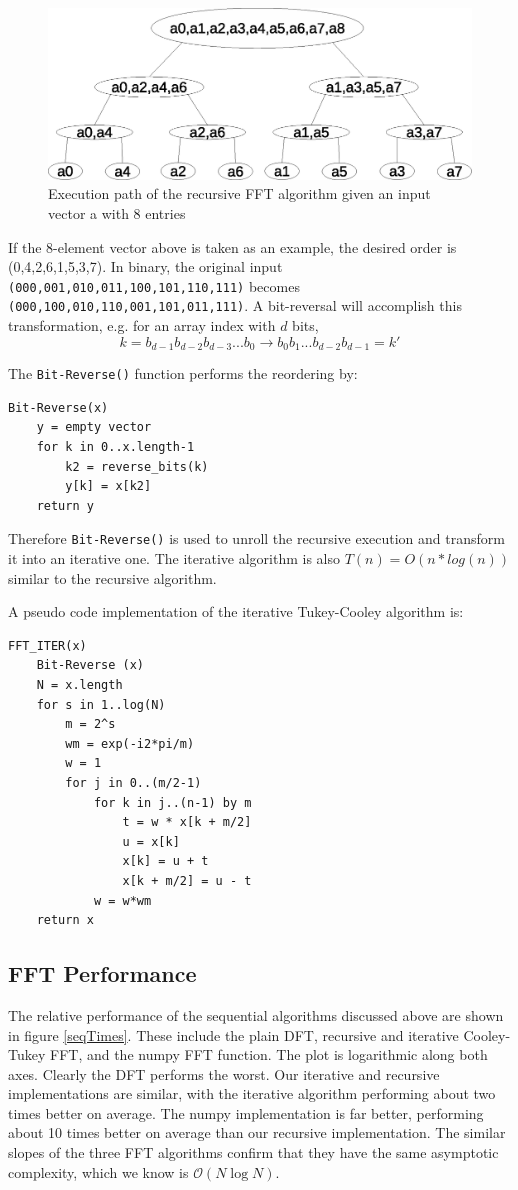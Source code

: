 \begin{figure}[h]
\center
\includegraphics[scale=0.5]{img/recursive_fft_execution.eps}
\caption{Execution path of the recursive FFT algorithm given an input vector a with 8 entries}
\end{figure}

If the 8-element vector above is taken as an example, the desired order is (0,4,2,6,1,5,3,7). In binary, the original input \texttt{(000,001,010,011,100,101,110,111)} becomes \texttt{(000,100,010,110,001,101,011,111)}. A bit-reversal will accomplish this transformation, e.g. for an array index with $d$ bits,
\[
k = b_{d-1}b_{d-2}b_{d-3}...b_0 \rightarrow b_0b_1...b_{d-2}b_{d-1} = k'
\]

The \texttt{Bit-Reverse()} function performs the reordering by:
\begin{lstlisting}
Bit-Reverse(x)
    y = empty vector
    for k in 0..x.length-1
        k2 = reverse_bits(k)
        y[k] = x[k2]
    return y
\end{lstlisting}

Therefore \texttt{Bit-Reverse()} is used to unroll the recursive execution and transform it into an iterative one. The iterative algorithm is also $T(n) = O(n * log(n))$ similar to the recursive algorithm.

A pseudo code implementation of the iterative Tukey-Cooley algorithm is:
\begin{lstlisting}
FFT_ITER(x)
    Bit-Reverse (x)
    N = x.length
    for s in 1..log(N)
        m = 2^s
        wm = exp(-i2*pi/m)
        w = 1
        for j in 0..(m/2-1)
            for k in j..(n-1) by m
                t = w * x[k + m/2]
                u = x[k]
                x[k] = u + t
                x[k + m/2] = u - t
            w = w*wm
    return x
\end{lstlisting}

\subsection{FFT Performance}
The relative performance of the sequential algorithms discussed above are shown in figure \ref{seqTimes}. These include the plain DFT, recursive and iterative Cooley-Tukey FFT, and the numpy FFT function. The plot is logarithmic along both axes. Clearly the DFT performs the worst. Our iterative and recursive implementations are similar, with the iterative algorithm performing about two times better on average. The numpy implementation is far better, performing about 10 times better on average than our recursive implementation. The similar slopes of the three FFT algorithms confirm that they have the same asymptotic complexity, which we know is $\mathcal{O}(N\log N)$.


